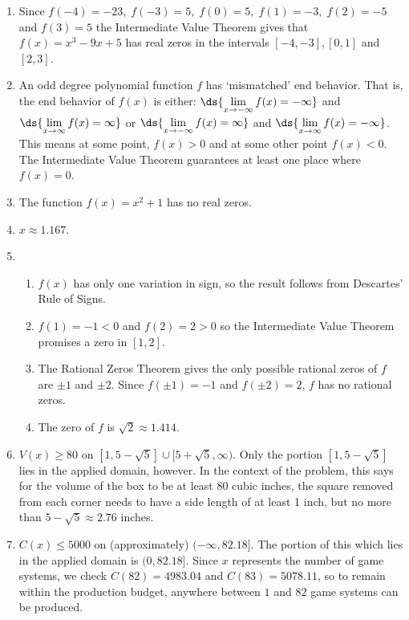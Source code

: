 \documentclass{ximera}
\begin{document}
\begin{enumerate}
\setcounter{enumi}{\value{HW}}

\item Since $f(-4)=-23,\; f(-3)=5,\; f(0)=5,\; f(1)=-3,\; f(2)=-5\;$ and $f(3)=5$ the Intermediate Value Theorem gives that $f(x) = x^{3} - 9x + 5$ has real zeros in the intervals $[-4, -3], [0, 1]$ and $[2, 3]$. 


\item  An odd degree polynomial  function $f$ has `mismatched' end behavior.  That is, the end behavior of $f(x)$ is either:  $\ds{\lim_{x \rightarrow -\infty} f(x) = -\infty}$  and  $\ds{\lim_{x \rightarrow \infty} f(x) = \infty}$  or $\ds{\lim_{x \rightarrow -\infty} f(x) = \infty}$  and  $\ds{\lim_{x \rightarrow \infty} f(x) = -\infty}$.  This means at some point, $f(x) > 0$ and at some other point $f(x) < 0$.  The Intermediate Value Theorem guarantees at least one place where $f(x) = 0$.

\item  The function $f(x) = x^2+1$ has no real zeros.

\item  $x \approx 1.167$.

\item  \begin{enumerate} 

\item  $f(x)$ has only one variation in sign, so the result follows from Descartes' Rule of Signs.

 \item $f(1) = -1<0$ and $f(2) = 2>0$ so the Intermediate Value Theorem promises a zero in $[1,2]$.

\item The Rational Zeros Theorem gives the only possible rational zeros of $f$ are $\pm 1$ and $\pm 2$.  Since $f(\pm 1) = -1$ and $f(\pm 2) = 2$, $f$ has no rational zeros.  

\item  The zero of $f$ is $\sqrt{2} \approx 1.414$. 

\end{enumerate}

\item  $V(x) \geq 80$ on $[1,5-\sqrt{5}] \cup [5+\sqrt{5}, \infty)$.  Only the portion $[1,5-\sqrt{5}]$ lies in the applied domain, however.   In the context of the problem, this says for the volume of the box to be at least 80 cubic inches, the square removed from each corner needs to have a side length of at least 1 inch, but no more than $5-\sqrt{5} \approx 2.76$ inches.

\item $C(x) \leq 5000$ on (approximately) $(-\infty, 82.18]$.  The portion of this which lies in the applied domain is $(0,82.18]$.  Since $x$ represents the number of game systems, we check $C(82) = 4983.04$ and $C(83) = 5078.11$, so to remain within the production budget, anywhere between $1$ and $82$ game systems can be produced.


\setcounter{HW}{\value{enumi}}
\end{enumerate}
\end{document}
